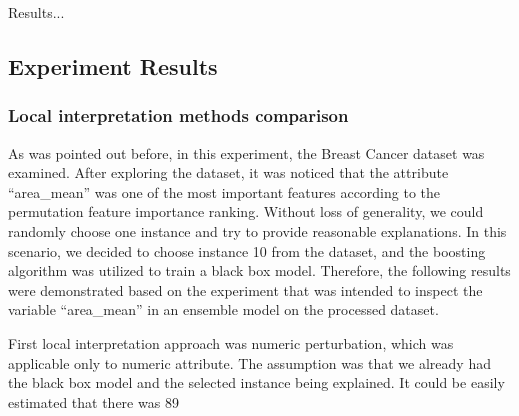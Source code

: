 Results...

\subsection{Experiment Results}



\subsubsection{Local interpretation methods comparison}
As was pointed out before, in this experiment, the Breast Cancer dataset was examined. After exploring the dataset, it was noticed that the attribute “area\_mean” was one of the most important features according to the permutation feature importance ranking. Without loss of generality, we could randomly choose one instance and try to provide reasonable explanations. In this scenario, we decided to choose instance 10 from the dataset, and the boosting algorithm was utilized to train a black box model. Therefore, the following results were demonstrated based on the experiment that was intended to inspect the variable “area\_mean” in an ensemble model on the processed dataset. 

First local interpretation approach was numeric perturbation, which was applicable only to numeric attribute. The assumption was that we already had the black box model and the selected instance being explained. It could be easily estimated that there was 89%

